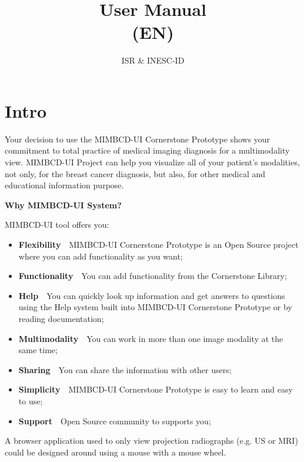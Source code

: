 \documentclass{tufte-book} %
\title{User Manual\\(EN)}
\author[User Manual]{ISR \& INESC-ID}
\begin{document}
\maketitle

\let\cleardoublepage\clearpage

\tableofcontents

\let\cleardoublepage\clearpage

\chapter{Intro}

Your decision to use the MIMBCD-UI Cornerstone Prototype shows your commitment to total practice of medical imaging diagnosis for a multimodality view. MIMBCD-UI Project can help you visualize all of your patient’s modalities, not only, for the breast cancer diagnosis, but also, for other medical and educational information purpose.

\hfill

\textbf{Why MIMBCD-UI System?}

\hfill

MIMBCD-UI tool offers you:

\begin{itemize}
\item \textbf{Flexibility}~\textendash~MIMBCD-UI Cornerstone Prototype is an Open Source project where you can add functionality as you want;
\item \textbf{Functionality}~\textendash~You can add functionality from the Cornerstone Library;
\item \textbf{Help}~\textendash~You can quickly look up information and get answers to questions using the Help system built into MIMBCD-UI Cornerstone Prototype or by reading documentation;
\item \textbf{Multimodality}~\textendash~You can work in more than one image modality at the same time;
\item \textbf{Sharing}~\textendash~You can share the information with other users;
\item \textbf{Simplicity}~\textendash~MIMBCD-UI Cornerstone Prototype is easy to learn and easy to use;
\item \textbf{Support}~\textendash~Open Source community to supports you;
\end{itemize}

\hfill

A browser application used to only view projection radiographs (e.g. US or MRI) could be designed around using a mouse with a mouse wheel.
\end{document}
